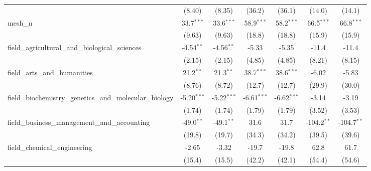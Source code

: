 \begin{tabular}{lcccccc}
                                                               & (8.40)         & (8.35)        & (36.2)         & (36.1)         & (14.0)        & (14.1)\\   
   mesh\_n                                                     & 33.7$^{***}$   & 33.6$^{***}$  & 58.9$^{***}$   & 58.2$^{***}$   & 66.5$^{***}$  & 66.8$^{***}$\\   
                                                               & (9.63)         & (9.63)        & (18.8)         & (18.8)         & (15.9)        & (15.9)\\   
   field\_agricultural\_and\_biological\_sciences              & -4.54$^{**}$   & -4.56$^{**}$  & -5.33          & -5.35          & -11.4         & -11.4\\   
                                                               & (2.15)         & (2.15)        & (4.85)         & (4.85)         & (8.21)        & (8.15)\\   
   field\_arts\_and\_humanities                                & 21.2$^{**}$    & 21.3$^{**}$   & 38.7$^{***}$   & 38.6$^{***}$   & -6.02         & -5.83\\   
                                                               & (8.76)         & (8.72)        & (12.7)         & (12.7)         & (29.9)        & (30.0)\\   
   field\_biochemistry\_genetics\_and\_molecular\_biology      & -5.20$^{***}$  & -5.22$^{***}$ & -6.61$^{***}$  & -6.62$^{***}$  & -3.14         & -3.19\\   
                                                               & (1.74)         & (1.74)        & (1.79)         & (1.79)         & (3.52)        & (3.53)\\   
   field\_business\_management\_and\_accounting                & -49.0$^{**}$   & -49.1$^{**}$  & 31.6           & 31.7           & -104.2$^{**}$ & -104.7$^{**}$\\   
                                                               & (19.8)         & (19.7)        & (34.3)         & (34.2)         & (39.5)        & (39.6)\\   
   field\_chemical\_engineering                                & -2.65          & -3.32         & -19.7          & -19.8          & 62.8          & 61.7\\   
                                                               & (15.4)         & (15.5)        & (42.2)         & (42.1)         & (54.4)        & (54.6)\\   

\end{tabular}
